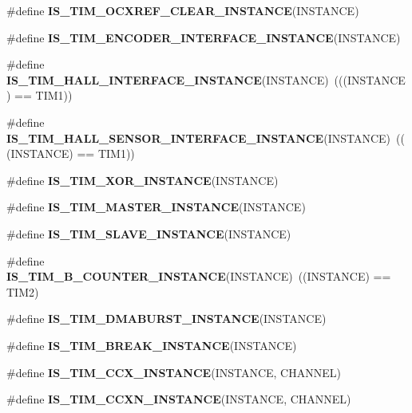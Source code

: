 \begin{DoxyCompactItemize}
\item 
\#define {\bfseries I\+S\+\_\+\+T\+I\+M\+\_\+\+O\+C\+X\+R\+E\+F\+\_\+\+C\+L\+E\+A\+R\+\_\+\+I\+N\+S\+T\+A\+N\+CE}(I\+N\+S\+T\+A\+N\+CE)
\item 
\#define {\bfseries I\+S\+\_\+\+T\+I\+M\+\_\+\+E\+N\+C\+O\+D\+E\+R\+\_\+\+I\+N\+T\+E\+R\+F\+A\+C\+E\+\_\+\+I\+N\+S\+T\+A\+N\+CE}(I\+N\+S\+T\+A\+N\+CE)
\item 
\mbox{\label{group___exported__macro_gacdcc047699e2d83c9d2b3a3f8375dff4}} 
\#define {\bfseries I\+S\+\_\+\+T\+I\+M\+\_\+\+H\+A\+L\+L\+\_\+\+I\+N\+T\+E\+R\+F\+A\+C\+E\+\_\+\+I\+N\+S\+T\+A\+N\+CE}(I\+N\+S\+T\+A\+N\+CE)~(((I\+N\+S\+T\+A\+N\+CE) == T\+I\+M1))
\item 
\mbox{\label{group___exported__macro_ga979ea18ba0931f5ed15cc2f3ac84794b}} 
\#define {\bfseries I\+S\+\_\+\+T\+I\+M\+\_\+\+H\+A\+L\+L\+\_\+\+S\+E\+N\+S\+O\+R\+\_\+\+I\+N\+T\+E\+R\+F\+A\+C\+E\+\_\+\+I\+N\+S\+T\+A\+N\+CE}(I\+N\+S\+T\+A\+N\+CE)~(((I\+N\+S\+T\+A\+N\+CE) == T\+I\+M1))
\item 
\#define {\bfseries I\+S\+\_\+\+T\+I\+M\+\_\+\+X\+O\+R\+\_\+\+I\+N\+S\+T\+A\+N\+CE}(I\+N\+S\+T\+A\+N\+CE)
\item 
\#define {\bfseries I\+S\+\_\+\+T\+I\+M\+\_\+\+M\+A\+S\+T\+E\+R\+\_\+\+I\+N\+S\+T\+A\+N\+CE}(I\+N\+S\+T\+A\+N\+CE)
\item 
\#define {\bfseries I\+S\+\_\+\+T\+I\+M\+\_\+\+S\+L\+A\+V\+E\+\_\+\+I\+N\+S\+T\+A\+N\+CE}(I\+N\+S\+T\+A\+N\+CE)
\item 
\mbox{\label{group___exported__macro_gac41867bf288927ff8ff10a85e67a591b}} 
\#define {\bfseries I\+S\+\_\+\+T\+I\+M\+\_\+B\+\_\+\+C\+O\+U\+N\+T\+E\+R\+\_\+\+I\+N\+S\+T\+A\+N\+CE}(I\+N\+S\+T\+A\+N\+CE)~((I\+N\+S\+T\+A\+N\+CE) == T\+I\+M2)
\item 
\#define {\bfseries I\+S\+\_\+\+T\+I\+M\+\_\+\+D\+M\+A\+B\+U\+R\+S\+T\+\_\+\+I\+N\+S\+T\+A\+N\+CE}(I\+N\+S\+T\+A\+N\+CE)
\item 
\#define {\bfseries I\+S\+\_\+\+T\+I\+M\+\_\+\+B\+R\+E\+A\+K\+\_\+\+I\+N\+S\+T\+A\+N\+CE}(I\+N\+S\+T\+A\+N\+CE)
\item 
\#define {\bfseries I\+S\+\_\+\+T\+I\+M\+\_\+\+C\+C\+X\+\_\+\+I\+N\+S\+T\+A\+N\+CE}(I\+N\+S\+T\+A\+N\+CE,  C\+H\+A\+N\+N\+EL)
\item 
\#define {\bfseries I\+S\+\_\+\+T\+I\+M\+\_\+\+C\+C\+X\+N\+\_\+\+I\+N\+S\+T\+A\+N\+CE}(I\+N\+S\+T\+A\+N\+CE,  C\+H\+A\+N\+N\+EL)

\end{DoxyCompactItemize}
